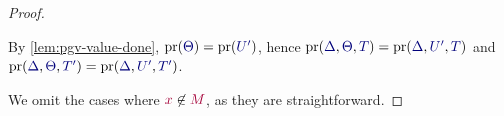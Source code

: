 \begin{proof}
\begin{case*}
    \begin{subcase*}[$\tm{x}\in\tm{M}$ and $\tm{x}\in\tm{N}$]
      By \cref{lem:pgv-value-done}, $\minpr(\ty{\Theta})=\minpr(\ty{U'})$, hence $\minpr(\ty{\Delta},\ty{\Theta},\ty{T})=\minpr(\ty{\Delta},\ty{U'},\ty{T})$ and $\minpr(\ty{\Delta},\ty{\Theta},\ty{T'})=\minpr(\ty{\Delta},\ty{U'},\ty{T'})$.
      \begin{mathpar}
      \end{mathpar}
    \end{subcase*}
  \end{case*}
  \noindent
  We omit the cases where $\tm{x}\not\in\tm{M}$, as they are straightforward.
\end{proof}

